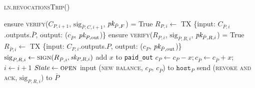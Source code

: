 \begin{center}
  \begin{processbox}{\textsc{ln}.\textsc{revocationsTrip}()}
    \begin{algorithmic}[1]
      \State ensure \textsc{verify}($C_{P, i+1}$, $\mathrm{sig}_{\bar{P}, C,
      i+1}$, $\textit{pk}_{\bar{P}, F}$) = True
      \label{code:ln:pay:revocations:verify-comm}
      \State $R_{P, i} \gets$ TX \{input: $C_{\bar{P}, i}$.outputs.$\bar{P}$,
      output: ($c_{\bar{P}}$, $\textit{pk}_{P, \mathrm{out}}$)\}
      \State ensure \textsc{verify}($R_{P, i}$, $\mathrm{sig}_{\bar{P}, R,
      i}$, $\textit{pk}_{\bar{P}, R, i}$) = True
      \label{code:ln:pay:revocations:verify-rev}
      \State $R_{\bar{P}, i} \gets$ TX \{input: $C_{P, i}$.outputs.$P$, output:
      ($c_P$, $\textit{pk}_{\bar{P}, \mathrm{out}}$)\}
      \State $\mathrm{sig}_{P, R, i} \gets \textsc{sign}(R_{\bar{P}, i},
      \textit{sk}_{P, R, i})$
      \label{code:ln:pay:revocations:sign-rev}
      \State add $x$ to \texttt{paid\_out}
      \label{code:ln:pay:revocations:paid-out}
      \State $c_P \gets c_P - x; c_{\bar{P}} \gets c_{\bar{P}} + x$; $i \gets
      i + 1$
      \State $\itistate \gets \textsc{open}$
       
        \State input (\textsc{new balance}, $c_P$, $c_{\bar{P}}$) to
        $\texttt{host}_P$
        \State {}
        \State {}
        \State {}
        \State {}
        \State {}
      \EndIf
      \State send (\textsc{revoke and ack}, $\mathrm{sig}_{P, R, i}$) to
      $\bar{P}$
      \label{code:ln:pay:revocations:send-rev}
      \State {}
      \State {}
      \State {}
      \label{code:ln:pay:revocations:verify}
      \State {}
      \label{code:ln:pay:revocations:paid-in}

\end{algorithmic}
\end{processbox}
\end{center}
